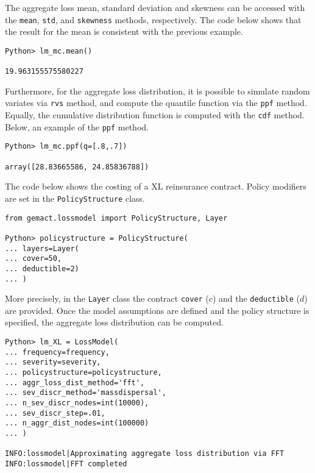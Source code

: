 \documentclass{article}
\begin{document}
The aggregate loss mean, standard deviation and skewness can be accessed with the \texttt{mean}, \texttt{std}, and \texttt{skewness} methods, respectively. The code below shows that the result for the mean is consistent with the previous example.

\begin{lstlisting}
Python> lm_mc.mean()

19.963155575580227
\end{lstlisting}


Furthermore, for the aggregate loss distribution, it is possible to simulate random variates via \texttt{rvs} method, and compute the quantile function via the \texttt{ppf} method. Equally, the cumulative distribution function is computed with the \texttt{cdf} method.
Below, an example of the \texttt{ppf} method.

\begin{lstlisting}
Python> lm_mc.ppf(q=[.8,.7])

array([28.83665586, 24.85836788])
\end{lstlisting}

The code below shows the costing of a XL reinsurance contract. Policy modifiers are set in the \texttt{PolicyStructure} class.

\begin{lstlisting}
from gemact.lossmodel import PolicyStructure, Layer

Python> policystructure = PolicyStructure(
... layers=Layer(
... cover=50,
... deductible=2)
... )
\end{lstlisting}

More precisely, in the \texttt{Layer} class the contract \texttt{cover} ($c$) and the \texttt{deductible} ($d$) are provided.
Once the model assumptions are defined and the policy structure is specified, the aggregate loss distribution can be computed.

\begin{lstlisting}
Python> lm_XL = LossModel(
... frequency=frequency,
... severity=severity,
... policystructure=policystructure,
... aggr_loss_dist_method='fft',
... sev_discr_method='massdispersal',
... n_sev_discr_nodes=int(10000),
... sev_discr_step=.01,
... n_aggr_dist_nodes=int(100000)
... )

INFO:lossmodel|Approximating aggregate loss distribution via FFT
INFO:lossmodel|FFT completed
\end{lstlisting}
\end{document}
